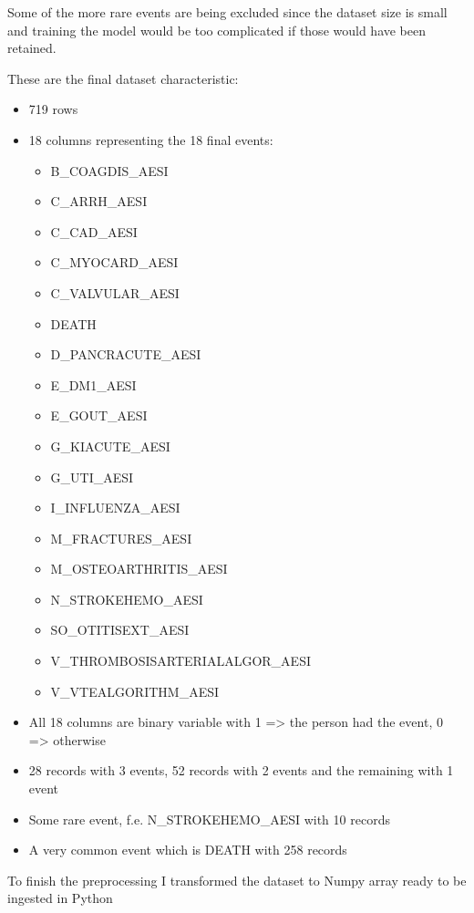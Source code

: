 \documentclass[
  letterpaper,
  DIV=11,
  numbers=noendperiod]{scrreprt}
\providecommand{\tightlist}{%
  \setlength{\itemsep}{0pt}\setlength{\parskip}{0pt}}\usepackage{longtable,booktabs,array}
\begin{document}
Some of the more rare events are being excluded since the dataset size
is small and training the model would be too complicated if those would
have been retained.

These are the final dataset characteristic:

\begin{itemize}
\tightlist
\item
  719 rows
\item
  18 columns representing the 18 final events:

  \begin{itemize}
  \tightlist
  \item
    B\_COAGDIS\_AESI
  \item
    C\_ARRH\_AESI
  \item
    C\_CAD\_AESI
  \item
    C\_MYOCARD\_AESI
  \item
    C\_VALVULAR\_AESI
  \item
    DEATH
  \item
    D\_PANCRACUTE\_AESI
  \item
    E\_DM1\_AESI
  \item
    E\_GOUT\_AESI
  \item
    G\_KIACUTE\_AESI
  \item
    G\_UTI\_AESI
  \item
    I\_INFLUENZA\_AESI
  \item
    M\_FRACTURES\_AESI
  \item
    M\_OSTEOARTHRITIS\_AESI
  \item
    N\_STROKEHEMO\_AESI
  \item
    SO\_OTITISEXT\_AESI
  \item
    V\_THROMBOSISARTERIALALGOR\_AESI
  \item
    V\_VTEALGORITHM\_AESI
  \end{itemize}
\item
  All 18 columns are binary variable with 1 =\textgreater{} the person
  had the event, 0 =\textgreater{} otherwise
\item
  28 records with 3 events, 52 records with 2 events and the remaining
  with 1 event
\item
  Some rare event, f.e. N\_STROKEHEMO\_AESI with 10 records
\item
  A very common event which is DEATH with 258 records
\end{itemize}

To finish the preprocessing I transformed the dataset to Numpy array
ready to be ingested in Python
\end{document}
